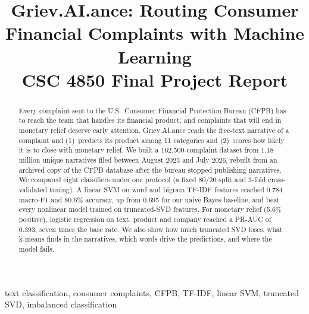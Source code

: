 \documentclass[conference]{IEEEtran}
\begin{document}
\title{Griev.AI.ance: Routing Consumer Financial Complaints with Machine Learning\\
{\large CSC 4850 Final Project Report}}

\author{
\and
{}
\and
{}
}

\maketitle

\begin{abstract}
Every complaint sent to the U.S.\ Consumer Financial Protection Bureau (CFPB) has to reach the team that handles its financial product, and complaints that will end in monetary relief deserve early attention. Griev.AI.ance reads the free-text narrative of a complaint and (1)~predicts its product among 11 categories and (2)~scores how likely it is to close with monetary relief. We built a 162,500-complaint dataset from 1.18 million unique narratives filed between August 2023 and July 2026, rebuilt from an archived copy of the CFPB database after the bureau stopped publishing narratives. We compared eight classifiers under one protocol (a fixed 80/20 split and 3-fold cross-validated tuning). A linear SVM on word and bigram TF-IDF features reached 0.784 macro-F1 and 80.6\% accuracy, up from 0.695 for our naive Bayes baseline, and beat every nonlinear model trained on truncated-SVD features. For monetary relief (5.6\% positive), logistic regression on text, product and company reached a PR-AUC of 0.393, seven times the base rate. We also show how much truncated SVD loses, what k-means finds in the narratives, which words drive the predictions, and where the model fails.
\end{abstract}

\begin{IEEEkeywords}
text classification, consumer complaints, CFPB, TF-IDF, linear SVM, truncated SVD, imbalanced classification
\end{IEEEkeywords}
\end{document}
